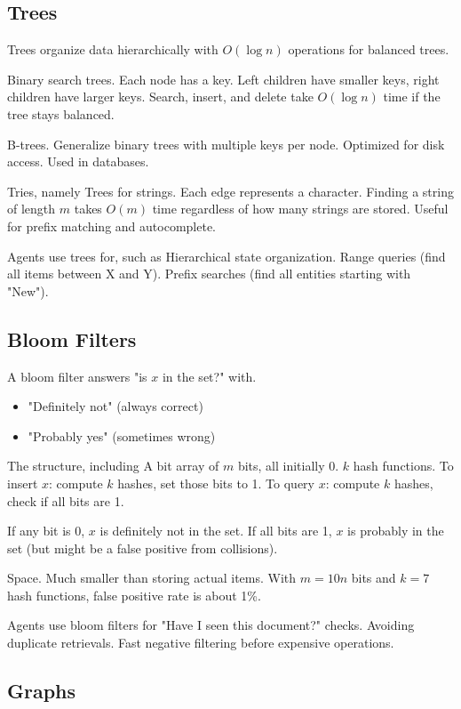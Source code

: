 \subsection{Trees}

Trees organize data hierarchically with $O(\log n)$ operations for balanced trees.

Binary search trees. Each node has a key. Left children have smaller keys, right children have larger keys. Search, insert, and delete take $O(\log n)$ time if the tree stays balanced.

B-trees. Generalize binary trees with multiple keys per node. Optimized for disk access. Used in databases.

Tries, namely Trees for strings. Each edge represents a character. Finding a string of length $m$ takes $O(m)$ time regardless of how many strings are stored. Useful for prefix matching and autocomplete.

Agents use trees for, such as Hierarchical state organization. Range queries (find all items between X and Y). Prefix searches (find all entities starting with "New").

\subsection{Bloom Filters}

A bloom filter answers "is $x$ in the set?" with.
\begin{itemize}
\item "Definitely not" (always correct)
\item "Probably yes" (sometimes wrong)
\end{itemize}

The structure, including A bit array of $m$ bits, all initially 0. $k$ hash functions. To insert $x$: compute $k$ hashes, set those bits to 1. To query $x$: compute $k$ hashes, check if all bits are 1.

If any bit is 0, $x$ is definitely not in the set. If all bits are 1, $x$ is probably in the set (but might be a false positive from collisions).

Space. Much smaller than storing actual items. With $m = 10n$ bits and $k = 7$ hash functions, false positive rate is about 1\%.

Agents use bloom filters for "Have I seen this document?" checks. Avoiding duplicate retrievals. Fast negative filtering before expensive operations.

\subsection{Graphs}


